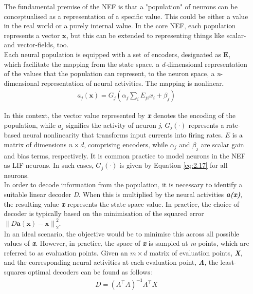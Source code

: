 \noindent The fundamental premise of the NEF is that a "population" of neurons can be conceptualised as a representation of a specific value. This could be either a value in the real world or a purely internal value. In the core NEF, each population represents a vector $\textbf{x}$, but this can be extended to representing things like scalar- and vector-fields, too.\\

\noindent Each neural population is equipped with a set of encoders, designated as \textbf{E}, which facilitate the mapping from the state space, a \textit{d}-dimensional representation of the values that the population can represent, to the neuron space, a \textit{n}-dimensional representation of neural activities. The mapping is nonlinear.
\begin{align}
a_{j}(\textbf{x}) = G_{j}\left( \alpha_{j}\sum_{i}^{} E_{ji}x_{i} +\beta_{j} \right) \label{eq:5.1} 
\end{align}

\noindent In this context, the vector value represented by \textbf{\textit{x}} denotes the encoding of the population, while $a_j$ signifies the activity of neuron \textit{j}, $G_j(\cdot)$ represents a rate-based neural nonlinearity that transforms input currents into firing rates. $E$ is a matrix of dimensions $n \times d$, comprising encoders, while $\alpha_j$ and $\beta_j$ are scalar gain and bias terms, respectively. It is common practice to model neurons in the NEF as LIF neurons. In such cases, $G_j(\cdot)$ is given by Equation \ref{eq:2.17} for all neurons.\\

\noindent In order to decode information from the population, it is necessary to identify a suitable linear decoder \textit{D}. When this is multiplied by the neural activities \textbf{\textit{a(x)}}, the resulting value \textbf{\textit{x}} represents the state-space value. In practice, the choice of decoder is typically based on the minimisation of the squared error $\left\| D \textbf{a} (\textbf{x})  - \textbf{x}\right\|^{2}_{2}$. \\

\noindent In an ideal scenario, the objective would be to minimise this across all possible values of \textbf{\textit{x}}. However, in practice, the space of \textbf{\textit{x}} is sampled at \textit{m} points, which are referred to as evaluation points. Given an $m \times d$ matrix of evaluation points, \textbf{\textit{X}}, and the corresponding neural activities at each evaluation point, \textbf{\textit{A}}, the least-squares optimal decoders can be found as follows:
\begin{align}
D = \left( A^\intercal A \right)^{-1} A^\intercal X \label{eq:5.2} 
\end{align}

